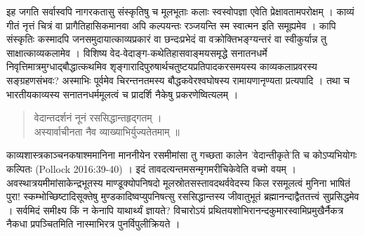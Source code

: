 {\dev इह जगति सर्वास्वपि नागरकतासु संस्कृतिषु च मूलभूताः कलाः स्वस्वोपज्ञा एवेति प्रेक्षावता\-मपरोक्षम् । काव्यं गीतं नृत्तं चित्रं वा प्रागैतिहासिकमानवा अपि कल्पयन्तः रञ्जयन्ति स्म स्वात्मन इति समूह्यमेव । कापि संस्कृतिः कस्मादपि जनसमुदायात्काव्यप्रकारं वा छन्दःप्रभेदं वा वक्रोक्तिभङ्ग्यन्तरं वा स्वीकुर्यान्न तु साक्षात्काव्यकलामेव । विशिष्य वेद-वेदाङ्ग-कथेतिहास\-वाङ्मयसमृद्धे सनातनधर्मे निवृत्तिमात्रमुग्धाद्बौद्धात्कथमिव शृङ्गारादिपुरुषार्थचतुष्टयप्रतिपाद\-करसमयस्य काव्यकलाप्रवरस्य सङ्ग्रहणसंभवः? अस्माभिः पूर्वमेव चिरन्तनतमस्य बौद्ध\-कवेरश्वघोषस्य रामायणानृण्यता प्रत्यपादि । तथा च भारतीयकाव्यस्य सनातनधर्ममूलत्वं च प्रादर्शि नैकेषु प्रकरणेष्वित्यलम् ।}  
\begin{quote}
{\dev वेदान्तदर्शनं नूनं रससिद्धान्तहृद्गतम् ।}\\
{\dev अस्यार्वाचीनता नैव व्याख्याभिर्युज्यतेतमाम् ॥}
\end{quote}

{\dev काव्यशास्त्रकाञ्चनकषाश्ममानिना माननीयेन रसमीमांसा तु गच्छता कालेन ’वेदान्तीकृते’ति च कोऽप्यभियोगः कल्पितः} (Pollock 2016:39-40) {\dev । इदं तावदत्यन्तमसन्मृगमरीचिकेवेति वच्मो वयम् । अवस्थात्रयमीमांसाकेन्द्रभूतस्य माण्डूक्योपनिषदो मूलस्रोतसस्तावदथर्ववेदस्य किल रसमूलत्वं मुनिना भाषितं पुरा! स्कम्भोच्छिष्टादिसूक्तेषु मुण्डकादिष्वप्युपनिषत्सु रस\-सिद्धान्तस्य जीवातुभूतं ब्रह्मानन्दाद्वैततत्त्वं सुप्रसिद्धमेव । सर्वमिदं समीक्ष्य किं न केनापि याथार्थ्यं ज्ञायते? विचारोऽयं प्रथितयशोभिरानन्दकुमारस्वामिप्रमुखैर्नैकत्र नैकधा प्रपञ्चितमिति नास्माभिरत्र पुनर्विपुलीक्रियते ।}   

